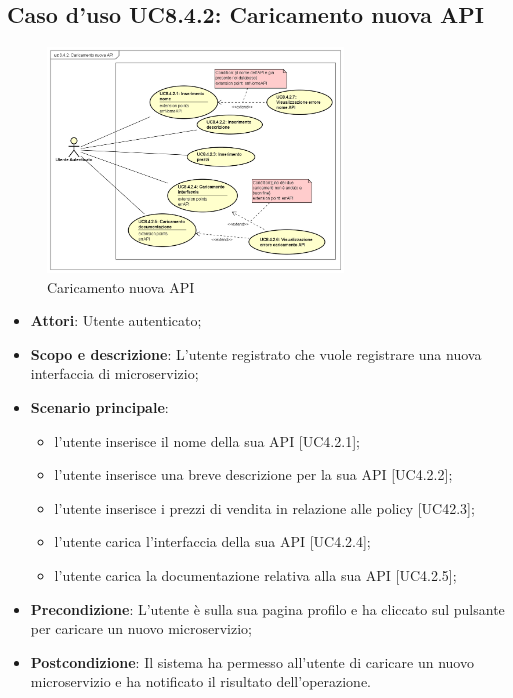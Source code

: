 \documentclass[12pt,a4paper,titlepage]{article}
\begin{document}
	\subsection{Caso d'uso UC8.4.2: Caricamento nuova API}
	\label{UC8.4.2}
	\begin{figure}[H]
		\centering
		\includegraphics[width=0.7\textwidth]{UseCase/CaricamentoNuovaAPI}
		\caption{Caricamento nuova API}
	\end{figure}
	\begin{itemize}
		\item \textbf{Attori}: Utente autenticato;
		\item \textbf{Scopo e descrizione}: L'utente registrato che vuole registrare una nuova interfaccia di microservizio;
		\item \textbf{Scenario principale}:
			\begin{itemize}
				\item l'utente inserisce il nome della sua API [UC4.2.1];
				\item l'utente inserisce una breve descrizione per la sua API [UC4.2.2];
				\item l'utente inserisce i prezzi di vendita in relazione alle policy [UC42.3];
				\item l'utente carica l'interfaccia della sua API [UC4.2.4];
				\item l'utente carica la documentazione relativa alla sua API [UC4.2.5];
			\end{itemize}
		\item \textbf{Precondizione}: L'utente è sulla sua pagina profilo e ha cliccato sul pulsante per caricare un nuovo microservizio;
		\item \textbf{Postcondizione}: Il sistema ha permesso all'utente di caricare un nuovo microservizio e ha notificato il risultato dell'operazione.
	\end{itemize}
\end{document}
